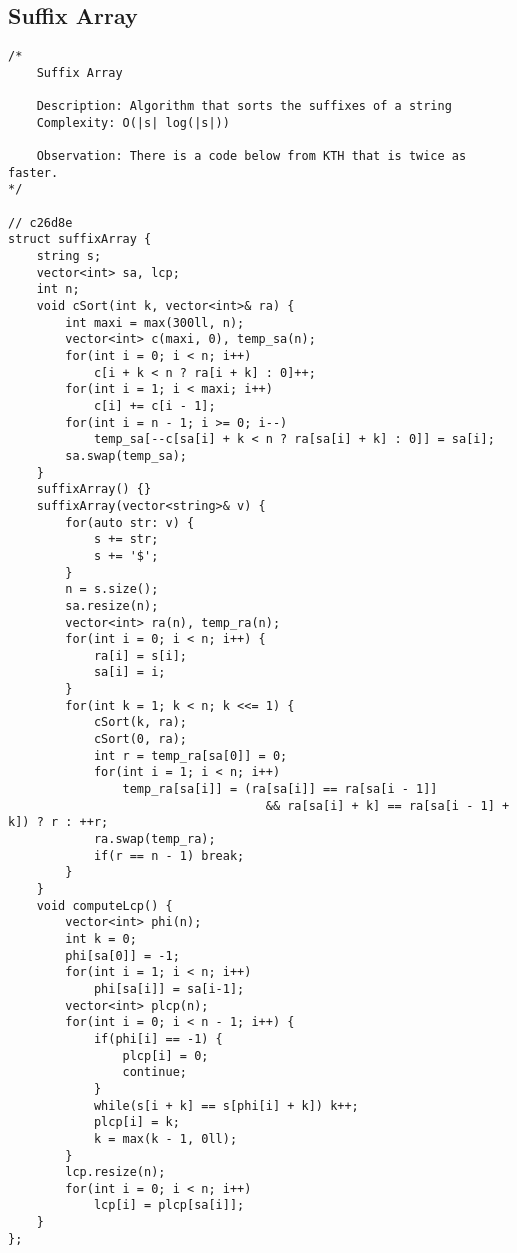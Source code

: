 \documentclass{article}
\begin{document}
\subsection{Suffix Array}
\begin{verbatim}
/*
	Suffix Array

	Description: Algorithm that sorts the suffixes of a string
	Complexity: O(|s| log(|s|))
	
    Observation: There is a code below from KTH that is twice as faster.
*/

// c26d8e
struct suffixArray {
    string s;
    vector<int> sa, lcp;
    int n;
    void cSort(int k, vector<int>& ra) {
        int maxi = max(300ll, n);
        vector<int> c(maxi, 0), temp_sa(n);
        for(int i = 0; i < n; i++)
            c[i + k < n ? ra[i + k] : 0]++;
        for(int i = 1; i < maxi; i++)
            c[i] += c[i - 1];
        for(int i = n - 1; i >= 0; i--)
            temp_sa[--c[sa[i] + k < n ? ra[sa[i] + k] : 0]] = sa[i];
        sa.swap(temp_sa);
    }
    suffixArray() {}
    suffixArray(vector<string>& v) {
        for(auto str: v) {
            s += str;
            s += '$';
        }
        n = s.size();
        sa.resize(n);
        vector<int> ra(n), temp_ra(n);
        for(int i = 0; i < n; i++) {
            ra[i] = s[i];
            sa[i] = i;
        }
        for(int k = 1; k < n; k <<= 1) {
            cSort(k, ra);
            cSort(0, ra);
            int r = temp_ra[sa[0]] = 0;
            for(int i = 1; i < n; i++)
                temp_ra[sa[i]] = (ra[sa[i]] == ra[sa[i - 1]] 
                                    && ra[sa[i] + k] == ra[sa[i - 1] + k]) ? r : ++r;
            ra.swap(temp_ra);
            if(r == n - 1) break;
        }
    }
    void computeLcp() {
        vector<int> phi(n);
        int k = 0;
        phi[sa[0]] = -1;
        for(int i = 1; i < n; i++)
            phi[sa[i]] = sa[i-1];
        vector<int> plcp(n);
        for(int i = 0; i < n - 1; i++) {
            if(phi[i] == -1) {
                plcp[i] = 0;
                continue;
            }
            while(s[i + k] == s[phi[i] + k]) k++;
            plcp[i] = k;
            k = max(k - 1, 0ll);
        }
        lcp.resize(n);
        for(int i = 0; i < n; i++)
            lcp[i] = plcp[sa[i]];
    }
};


\end{verbatim}
\end{document}
